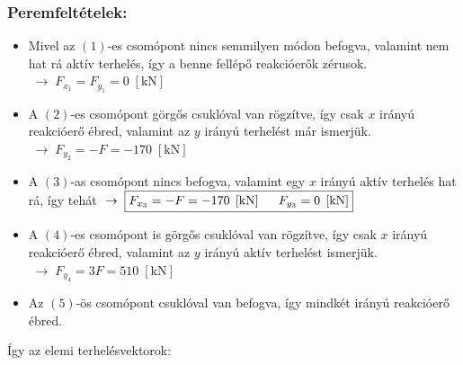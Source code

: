 \documentclass[12pt,a4paper]{article}
\def\kN{\; \left[\mathrm{kN}\right]}
\begin{document}
\subsubsection*{Peremfeltételek:}
\begin{itemize}
    \item Mivel az $\left(1\right)$-es csomópont nincs semmilyen módon
          befogva, valamint nem hat rá aktív terhelés, így a benne fellépő
          reakcióerők zérusok. $\; \rightarrow \; \boxed{F_{x_1}=F_{y_1}= 0 \kN}$
    \item A  $\left(2\right)$-es csomópont görgős csuklóval van rögzítve, így
          csak $x$ irányú reakcióerő ébred, valamint az $y$ irányú terhelést már ismerjük.
          $\; \rightarrow \; \boxed{F_{y_2}=-F=-170 \kN}$
    \item A  $\left(3\right)$-as csomópont nincs befogva, valamint egy $x$
          irányú aktív terhelés hat rá, így tehát $\; \rightarrow \; \boxed{F_{x_3}=-F=-170 \kN \hspace{5mm}
                  F_{y_3}=0 \kN}$
    \item A $\left(4\right)$-es csomópont is görgős csuklóval van rögzítve,
          így csak $x$ irányú reakcióerő ébred, valamint az $y$ irányú aktív
          terhelést ismerjük. $\; \rightarrow \; \boxed{F_{y_4}=3 F=510 \kN}$
    \item Az $\left(5\right)$-ös csomópont csuklóval van befogva, így mindkét irányú
          reakcióerő ébred.
\end{itemize}
Így az elemi terhelésvektorok:
\end{document}
